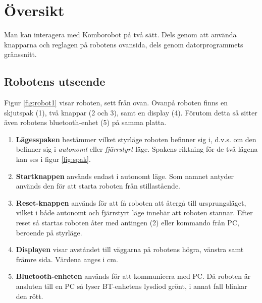 
%
%


\section{Översikt}

Man kan interagera med Komborobot på två sätt. Dels genom att använda knapparna och reglagen på robotens ovansida, dels genom datorprogrammets gränssnitt. 

\subsection{Robotens utseende}

Figur \ref{fig:robot1} visar roboten, sett från ovan. Ovanpå roboten finns en skjutspak (1), två knappar (2 och 3),  samt en display (4).   Förutom detta så sitter även robotens bluetooth-enhet (5) på samma platta. 


\begin{enumerate}
\item{\bf Lägesspaken} bestämmer vilket styrläge roboten befinner sig i, d.v.s. om den befinner sig i \emph{autonomt} eller \emph{fjärrstyrt} läge. Spakens riktning för de två lägena kan ses i figur \ref{fig:spak}.
\item {\bf Startknappen} används endast i autonomt läge. Som namnet antyder används den för att starta roboten från stillastående. 
\item{\bf Reset-knappen} används för att få roboten att återgå till ursprungsläget, vilket i både autonomt och fjärrstyrt läge innebär att roboten stannar. Efter reset så startas roboten åter med antingen (2) eller kommando från PC, beroende på styrläge.
\item{\bf Displayen} visar avståndet till väggarna på robotens högra, vänstra samt främre sida. Värdena anges i cm. 
\item{\bf Bluetooth-enheten} används för att kommunicera med PC. Då roboten är ansluten till en PC så lyser BT-enhetens lysdiod grönt, i annat fall blinkar den rött. 
\end{enumerate}

